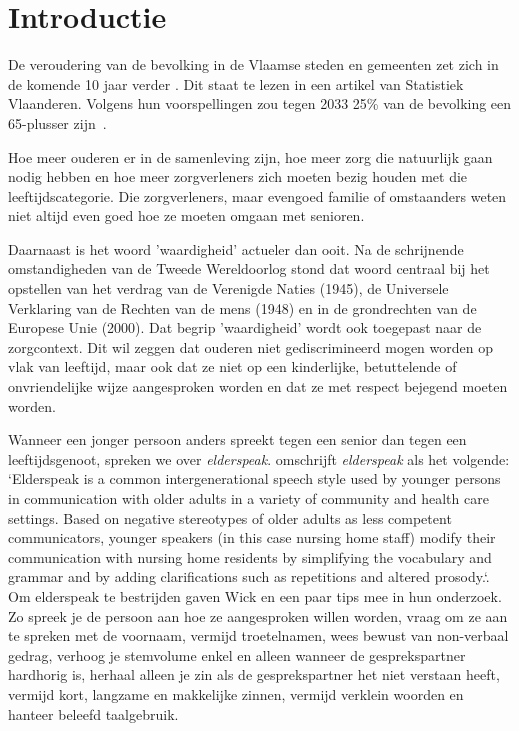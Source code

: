 
\section{Introductie} %
\label{sec:introductie}

De veroudering van de bevolking in de Vlaamse steden en gemeenten zet zich in de komende 10 jaar verder \textcite{StatistiekVlaanderen2018}. Dit staat te lezen in een artikel van Statistiek Vlaanderen. Volgens hun voorspellingen zou tegen 2033 25\% van de bevolking een 65-plusser zijn~\autocite{StatistiekVlaanderen2018}.

Hoe meer ouderen er in de samenleving zijn, hoe meer zorg die natuurlijk gaan nodig hebben en hoe meer zorgverleners zich moeten bezig houden met die leeftijdscategorie. Die zorgverleners, maar evengoed familie of omstaanders weten niet altijd even goed hoe ze moeten omgaan met senioren.

Daarnaast is het woord 'waardigheid' actueler dan ooit. Na de schrijnende omstandigheden van de Tweede Wereldoorlog stond dat woord centraal bij het opstellen van het verdrag van de Verenigde Naties (1945), de Universele Verklaring van de Rechten van de mens (1948) en in de grondrechten van de Europese Unie (2000). Dat begrip 'waardigheid' wordt ook toegepast naar de zorgcontext. Dit wil zeggen dat ouderen niet gediscrimineerd mogen worden op vlak van leeftijd, maar ook dat ze niet op een kinderlijke, betuttelende of onvriendelijke wijze aangesproken worden en dat ze met respect bejegend moeten worden.~\autocite{Campens}

Wanneer een jonger persoon anders spreekt tegen een senior dan tegen een leeftijdsgenoot, spreken we over \textit{elderspeak}. \textcite{Williams2011} omschrijft \textit{elderspeak} als het volgende: `Elderspeak is a common intergenerational speech style used by younger persons in communication with older adults in a variety of community and health care settings. Based on negative stereotypes of older adults as less competent communicators, younger speakers (in this case nursing home staff) modify their communication with nursing home residents by simplifying the vocabulary and grammar and by adding clarifications such as repetitions and altered prosody.`. Om elderspeak te bestrijden gaven Wick en \textcite{Wick2007} een paar tips mee in hun onderzoek. Zo spreek je de persoon aan hoe ze aangesproken willen worden, vraag om ze aan te spreken met de voornaam, vermijd troetelnamen, wees bewust van non-verbaal gedrag, verhoog je stemvolume enkel en alleen wanneer de gesprekspartner hardhorig is, herhaal alleen je zin als de gesprekspartner het niet verstaan heeft, vermijd kort, langzame en makkelijke zinnen, vermijd verklein woorden en hanteer beleefd taalgebruik.

